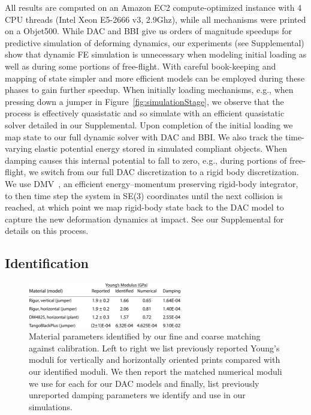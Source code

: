 All results are computed on an Amazon EC2 compute-optimized instance with 4 CPU threads (Intel Xeon E5-2666 v3, 2.9Ghz), while all mechanisms were printed on a Objet500.
While DAC and BBI give us orders of magnitude speedups for predictive simulation of deforming dynamics, our experiments (see Supplemental) show that dynamic FE simulation is unnecessary when modeling initial loading as well as during some portions of free-flight. With careful book-keeping and mapping of state simpler and more efficient models can be employed during these phases to gain further speedup.
When initially loading mechanisms, e.g., when pressing down a jumper in Figure~\ref{fig:simulationStage}, we observe that the process is effectively quasistatic and so simulate with an efficient quasistatic solver detailed in our Supplemental. Upon completion of the initial loading we map state to our full dynamic solver with DAC and BBI.
We also track the time-varying elastic potential energy stored in simulated compliant objects. When damping causes this internal potential to fall to zero, e.g., during portions of free-flight, we switch from our full DAC discretization to a rigid body discretization. We use DMV~\cite{Moser:1991dl}, an efficient energy--momentum preserving rigid-body integrator, to then time step the system in SE(3) coordinates until the next collision is reached, at which point we map rigid-body state back to the DAC model to capture the new deformation dynamics at impact. See our Supplemental for details on this process.

\subsection{Identification}
\begin{figure}[h!]
\centering
\includegraphics[width=0.6\textwidth]{figs/materials_table}
\caption{Material parameters identified by our fine and coarse matching against calibration. Left to right we list previously reported Young's moduli for vertically and horizontally oriented prints compared with our identified moduli. We then report the matched numerical moduli we use for each for our DAC models and finally, list previously unreported damping parameters we identify and use in our simulations. 
}
\label{fig:identified_params}
\end{figure}

